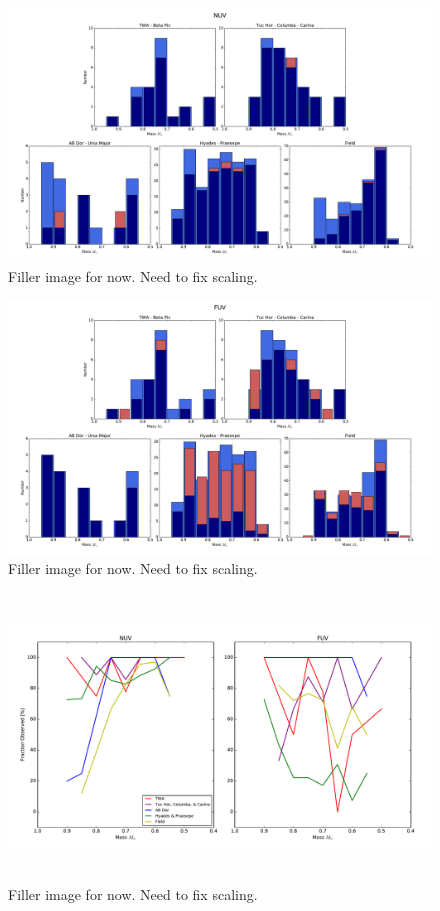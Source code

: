 \documentclass[twocolumn]{aastex62}
\begin{document}
\begin{figure}[h]
\centering
\includegraphics[width=.9\linewidth]{massdistributions_nuv.pdf}
\caption{Filler image for now. Need to fix scaling. \label{fig:massdistributions_nuv}}
\end{figure}

\begin{figure}[h]
\centering
\includegraphics[width=.9\linewidth]{massdistributions_fuv.pdf}
\caption{Filler image for now. Need to fix scaling. \label{fig:massdistributions_fuv}}
\end{figure}

\begin{figure}[th]
\includegraphics[width=\linewidth, height=3in]{massfractions.pdf}
\caption{Filler image for now. Need to fix scaling. \label{fig:mass_fractions}}
\end{figure}
\end{document}
